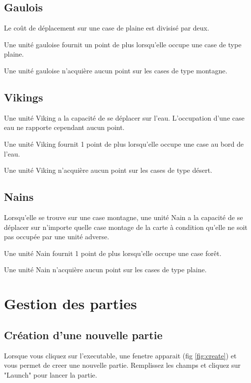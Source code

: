 \documentclass[a4paper,12pt]{article}
\begin{document}
\subsection{Gaulois}
Le coût de déplacement sur une case de plaine est divisisé par deux.

Une unité gauloise fournit un point de plus lorsqu'elle occupe une case de type plaine.

Une unité gauloise n'acquière aucun point sur les cases de type montagne.

\subsection{Vikings}
Une unité Viking a la capacité de se déplacer sur l’eau. L’occupation d’une case eau ne
rapporte cependant aucun point.

Une unité Viking fournit 1 point de plus lorsqu’elle occupe une case au bord de l’eau.

Une unité Viking n’acquière aucun point sur les cases de type désert.

\subsection{Nains}
Lorsqu’elle se trouve sur une case montagne, une unité Nain a la capacité de se déplacer
sur n’importe quelle case montage de la carte à condition qu’elle ne soit pas occupée par
une unité adverse.

Une unité Nain fournit 1 point de plus lorsqu’elle occupe une case forêt.

Une unité Nain n’acquière aucun point sur les cases de type plaine.

\section{Gestion des parties}
\subsection{Création d'une nouvelle partie}
Lorsque vous cliquez sur l'executable, une fenetre apparait (fig \ref{fig:create}) et vous permet de creer une nouvelle partie. Remplissez les champs et cliquez sur "Launch" pour lancer la partie.
\end{document}
